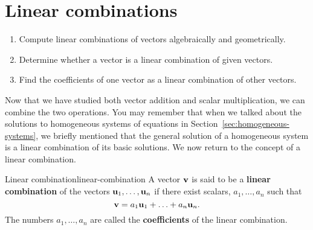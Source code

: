 \section{Linear combinations}
\label{sec:linear-combinations-rn}

\begin{outcome}
  \begin{enumerate}
  \item Compute linear combinations of vectors algebraically and
    geometrically.
  \item Determine whether a vector is a linear combination of given
    vectors.
  \item Find the coefficients of one vector as a linear combination of
    other vectors.
  \end{enumerate}
\end{outcome}

Now that we have studied both vector addition and scalar
multiplication, we can combine the two operations. You may remember
that when we talked about the solutions to homogeneous systems of
equations in Section~\ref{sec:homogeneous-systems}, we briefly
mentioned that the general solution of a homogeneous system is a
linear combination of its basic solutions. We now return to the
concept of a linear combination.

\begin{definition}{Linear combination}{linear-combination}
  A vector $\mbox{\bf v}$ is said to be a \textbf{linear
    combination} of the vectors
  $\mbox{\bf u}_1,\ldots, \mbox{\bf u}_n $ if there exist scalars,
  $a_{1},\ldots,a_{n}$ such that
  \begin{equation*}
    \mbox{\bf v} = a_1 \mbox{\bf u}_1 + \ldots + a_n \mbox{\bf u}_n.
  \end{equation*}
  The numbers $a_1,\ldots,a_n$ are called the
  \textbf{coefficients}
  of the linear combination.
\end{definition}

